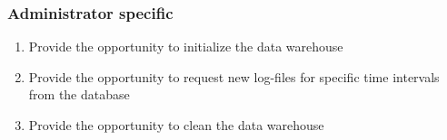 \subsubsection*{Administrator specific}

\begin{enumerate}[resume]
   
  \item Provide the opportunity to initialize the data warehouse\label{f27}
   
  \item Provide the opportunity to request new log-files for specific time intervals
  	from the database \label{f28}
  
  \item Provide the opportunity to clean the data warehouse \label{f29}
   
\end{enumerate}


